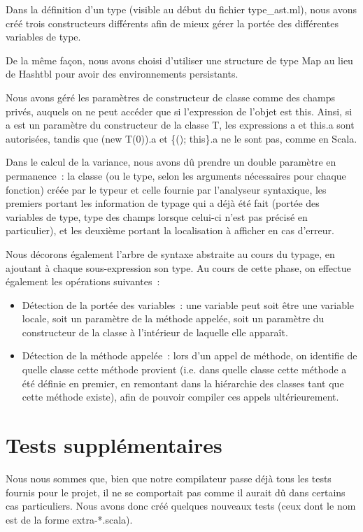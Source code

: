 \documentclass[a4paper,10pt]{article}
\newcommand{\code}[1]{{\fontfamily{pcr}\selectfont #1}}
\begin{document}
Dans la définition d'un type (visible au début du fichier
\code{type\_{}ast.ml}), nous avons créé trois constructeurs différents
afin de mieux gérer la portée des différentes variables de type.

De la même façon, nous avons choisi d'utiliser une structure de type
\code{Map} au lieu de \code{Hashtbl} pour avoir des environnements
persistants.

Nous avons géré les paramètres de constructeur de classe comme des
champs privés, auquels on ne peut accéder que si l'expression de
l'objet est \code{this}. Ainsi, si \code{a} est un paramètre du
constructeur de la classe T, les expressions \code{a} et \code{this.a}
sont autorisées, tandis que \code{(new T(0)).a} et \code{\{();
  this\}.a} ne le sont pas, comme en Scala.

Dans le calcul de la variance, nous avons dû prendre un double
paramètre en permanence~: la classe (ou le type, selon les arguments
nécessaires pour chaque fonction) créée par le typeur et celle fournie
par l'analyseur syntaxique, les premiers portant les information de
typage qui a déjà été fait (portée des variables de type, type des
champs lorsque celui-ci n'est pas précisé en particulier), et les
deuxième portant la localisation à afficher en cas d'erreur.

Nous décorons également l'arbre de syntaxe abstraite au cours du
typage, en ajoutant à chaque sous-expression son type. Au cours de
cette phase, on effectue également les opérations suivantes~:
\begin{itemize}
\item{Détection de la portée des variables~: une variable peut soit
    être une variable locale, soit un paramètre de la méthode appelée,
  soit un paramètre du constructeur de la classe à l'intérieur de
  laquelle elle apparaît.}
\item{Détection de la méthode appelée~: lors d'un appel de méthode, on
    identifie de quelle classe cette méthode provient (i.e. dans
    quelle classe cette méthode a été définie en premier, en remontant
    dans la hiérarchie des classes tant que cette méthode existe),
    afin de pouvoir compiler ces appels ultérieurement.}
\end{itemize}

\section{Tests supplémentaires}

Nous nous sommes que, bien que notre compilateur passe déjà tous les
tests fournis pour le projet, il ne se comportait pas comme il aurait
dû dans certains cas particuliers. Nous avons donc créé quelques
nouveaux tests (ceux dont le nom est de la forme \code{extra-*.scala}).
\end{document}

